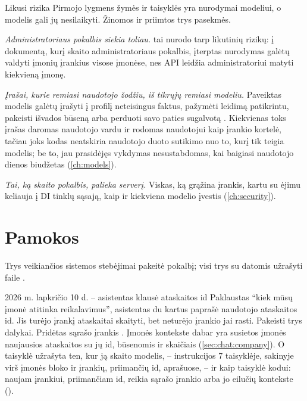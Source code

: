 \begin{notebox}{Likusi rizika}
Pirmojo lygmens žymės ir taisyklės yra nurodymai modeliui, o modelis gali jų nesilaikyti. Žinomos
ir priimtos trys pasekmės.

\emph{Administratoriaus pokalbis siekia toliau.}  tai nurodo tarp
likutinių rizikų: į dokumentą, kurį skaito administratoriaus pokalbis, įterptas nurodymas galėtų
valdyti įmonių įrankius visose įmonėse, nes API leidžia administratoriui matyti kiekvieną įmonę.

\emph{Įrašai, kurie remiasi naudotojo žodžiu, iš tikrųjų remiasi modeliu.} Paveiktas modelis
galėtų įrašyti į profilį neteisingus faktus, pažymėti leidimą patikrintu, pakeisti išvados
būseną arba perduoti savo paties
sugalvotą . Kiekvienas toks įrašas daromas naudotojo vardu ir rodomas
naudotojui kaip įrankio kortelė, tačiau joks kodas neatskiria naudotojo duoto sutikimo nuo to,
kurį tik teigia modelis; be to, jau prasidėjęs vykdymas nesustabdomas, kai baigiasi naudotojo
dienos biudžetas (\cref{ch:models}).

\emph{Tai, ką skaito pokalbis, palieka serverį.} Viskas, ką grąžina įrankis, kartu su ėjimu
keliauja į DI tinklų sąsają, kaip ir kiekviena modelio įvestis (\cref{ch:security}).
\end{notebox}


\section{Pamokos}\label{sec:chat:lessons}

Trys veikiančios sistemos stebėjimai pakeitė pokalbį; visi trys su datomis užrašyti faile
.

\begin{lessonbox}{2026 m. lapkričio 10 d. -- asistentas klausė ataskaitos id}
Paklaustas \enquote{kiek mūsų įmonė atitinka reikalavimus}, asistentas du kartus paprašė
naudotojo ataskaitos id. Jis turėjo įrankį ataskaitai skaityti, bet neturėjo įrankio jai rasti.
Pakeisti trys dalykai. Pridėtas sąrašo įrankis . Įmonės kontekste dabar yra
susietos įmonės naujausios ataskaitos su jų id, būsenomis ir skaičiais (\cref{sec:chat:company}).
O taisyklė užrašyta ten, kur ją skaito modelis, -- instrukcijos 7 taisyklėje, sakinyje virš
įmonės bloko ir įrankių, priimančių id, aprašuose, -- ir kaip taisyklė kodui: naujam įrankiui,
priimančiam id, reikia sąrašo įrankio arba jo eilučių kontekste ().
\end{lessonbox}

